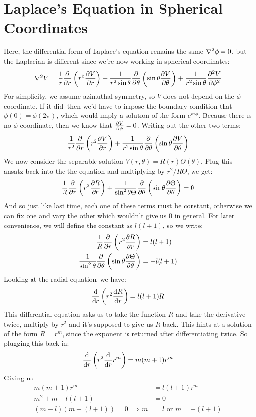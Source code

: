 \section{Laplace's Equation in Spherical Coordinates}
Here, the differential form of Laplace's equation remains the same $\nabla^2 \phi = 0$, but the Laplacian is 
different since we're now working in spherical coordinates:
\[ \nabla^2 V = \frac{1}{r}\pdv{r}\left( r^2 \pdv{V}{r} \right) + \frac{1}{r^2 \sin \theta}\pdv{\theta}
\left( \sin \theta \pdv{V}{\theta} \right)  + \frac{1}{r^2 \sin \theta}\pdv[2]{V}{\phi}\]
For simplicity, we assume azimuthal symmetry, so $V$ does not depend on the $\phi$ coordinate. If it did, then 
we'd have to impose the boundary condition that $\phi(0) = \phi(2\pi)$, which would imply a solution of the form
$e^{in\phi}$. Because there is no $\phi$ coordinate, then we know that $\pdv{V}{\phi} =0$. Writing out the other
two terms: 
\[ \frac{1}{r^2} \pdv{r} \left( r^2 \pdv{V}{r} \right) + \frac{1}{r^2 \sin \theta}\pdv{\theta}
\left( \sin \theta \pdv{V}{\theta} \right) \]
We now consider the separable solution  $V(r, \theta) = R(r) \Theta(\theta)$. Plug this ansatz back into the 
the equation and multiplying by $r^2/R\Theta$, we get: 
\[ \frac{1}{R}\pdv{r}\left(r^2 \pdv{R}{r}\right) + \frac{1}{\sin^2 \theta \Theta}\pdv{\theta}
\left( \sin \theta \pdv{\Theta}{\theta} \right) = 0\]
And so just like last time, each one of these terms must be constant, otherwise we can fix one and vary the other
which wouldn't give us 0 in general. For later convenience, we will define the constant as $l (l+1)$, so we write:
\begin{align*}
		\frac{1}{R}\pdv{r}\left( r^2 \pdv{R}{r} \right) &= l(l+1)\\
		\frac{1}{\sin^2 \theta}\pdv{\theta}\left( \sin \theta \pdv{\Theta}{\theta} \right) &= -l(l+1)
\end{align*}
Looking at the radial equation, we have:
\[ \dv{r}\left( r^2 \dv{R}{r} \right) = l(l+1)R\]
This differential equation asks us to take the function $R$ and take the derivative twice, multiply by $r^2$ and 
it's supposed to give us $R$ back. This hints at a solution of the form $R = r^m$, since the exponent is returned
after differentiating twice. So plugging this back in: 
\[ \dv{r}\left( r^2 \dv{r} r^m \right) = m(m+1)r^m\] 
Giving us 
\begin{align*}
		m(m+1)r^m &= l(l+1)r^m\\
		m^2 + m - l(l+1)&= 0\\
		(m-l)(m+(l+1)) = 0 \implies m &= l \text{ or } m = -(l+1)
\end{align*}
